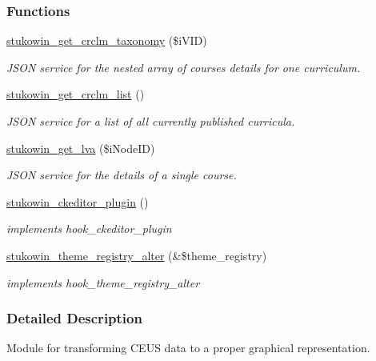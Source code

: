 \subsubsection*{Functions}
\begin{DoxyCompactItemize}
\item 
\hyperlink{group___drupal2_a_g_g_gaf137f10bef98707dacaf33d6581773d0}{stukowin\+\_\+get\+\_\+crclm\+\_\+taxonomy} (\$i\+V\+I\+D)
\begin{DoxyCompactList}\small\item\em J\+S\+O\+N service for the nested array of courses details for one curriculum. \end{DoxyCompactList}\item 
\hyperlink{group___drupal2_a_g_g_gad0cb4d7faa68097f5b7df8311e36b22e}{stukowin\+\_\+get\+\_\+crclm\+\_\+list} ()
\begin{DoxyCompactList}\small\item\em J\+S\+O\+N service for a list of all currently published curricula. \end{DoxyCompactList}\item 
\hyperlink{group___drupal2_a_g_g_ga7522e206f1a87971b916a7a0be0098c6}{stukowin\+\_\+get\+\_\+lva} (\$i\+Node\+I\+D)
\begin{DoxyCompactList}\small\item\em J\+S\+O\+N service for the details of a single course. \end{DoxyCompactList}\item 
\hyperlink{group___drupal2_a_g_g_gae3c906d1ab9c3d8ed245d58c1ebf2a4a}{stukowin\+\_\+ckeditor\+\_\+plugin} ()
\begin{DoxyCompactList}\small\item\em implements hook\+\_\+ckeditor\+\_\+plugin \end{DoxyCompactList}\item 
\hyperlink{group___drupal2_a_g_g_ga3bf2203298453c41bf9a5ec48d3c2de3}{stukowin\+\_\+theme\+\_\+registry\+\_\+alter} (\&\$theme\+\_\+registry)
\begin{DoxyCompactList}\small\item\em implements hook\+\_\+theme\+\_\+registry\+\_\+alter \end{DoxyCompactList}\end{DoxyCompactItemize}


\subsubsection{Detailed Description}
Module for transforming C\+E\+U\+S data to a proper graphical representation. 

